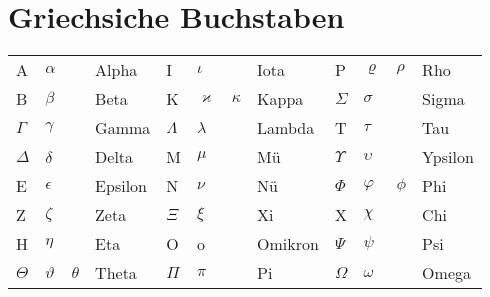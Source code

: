 \section{Griechsiche Buchstaben}
	\renewcommand{\arraystretch}{1.5}
	\begin{tabular}{| p{0.7cm} p{0.7cm} p{0.7cm} p{2cm} | p{0.7cm} p{0.7cm} p{0.7cm} p{2cm} | p{0.7cm} p{0.7cm} p{0.7cm} p{2cm} | }
		\hline
		A & $\alpha$ & & Alpha & I & $\iota$ & & Iota & P & $\varrho$ & $\rho$ & Rho\\
		B & $\beta$ & & Beta & K & $\varkappa$ & $\kappa$ & Kappa & $\Sigma$ & $\sigma$ & & Sigma\\
		$\Gamma$ & $\gamma$ & & Gamma & $\Lambda$ & $\lambda$ & & Lambda & T & $\tau$ & & Tau\\
		$\Delta$ & $\delta$ & & Delta & M & $\mu$ & & Mü & $\Upsilon$ & $\upsilon$ & & Ypsilon\\
		E & $\epsilon$ & & Epsilon & N & $\nu$ & & Nü & $\Phi$ & $\varphi$ & $\phi$ & Phi \\
		Z & $\zeta$ & & Zeta & $\Xi$ & $\xi$ & & Xi & X & $\chi$ & & Chi \\
		H & $\eta$ & & Eta & O & o & & Omikron & $\Psi$ & $\psi$ & & Psi\\
		$\Theta$ & $\vartheta$ & $\theta$ & Theta & $\Pi$ & $\pi$ & & Pi & $\Omega$ & $\omega$ & & Omega \\
		\hline
	\end{tabular}
	\renewcommand{\arraystretch}{1}	